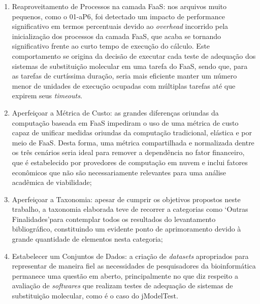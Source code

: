 \documentclass[english,brazilian]{UNISINOSmonografia} %
\begin{document}
\begin{enumerate}[label={\arabic*)}]
	\item Reaproveitamento de Processos na camada FaaS: nos arquivos muito pequenos, como o 01-aP6, foi detectado um impacto de performance significativo em termos percentuais devido ao \textit{overhead} incorrido pela inicialização dos processos da camada FaaS, que acaba se tornando significativo frente ao curto tempo de execução do cálculo.
	Este comportamento se origina da decisão de executar cada teste de adequação dos sistemas de substituição molecular em uma tarefa do FaaS, sendo que, para as tarefas de curtíssima duração, seria mais eficiente manter um número menor de unidades de execução ocupadas com múltiplas tarefas até que expirem seus \textit{timeouts}.
	
	\item Aperfeiçoar a Métrica de Custo: as grandes diferenças oriundas da computação baseada em FaaS impediram o uso de uma métrica de custo capaz de unificar medidas oriundas da computação tradicional, elástica e por meio de FaaS.
	Desta forma, uma métrica compartilhada e normalizada dentre os três cenários seria ideal para remover a dependência no fator financeiro, que é estabelecido por provedores de computação em nuvem e inclui fatores econômicos que não são necessariamente relevantes para uma análise acadêmica de viabilidade;
	
	\item Aperfeiçoar a Taxonomia: apesar de cumprir os objetivos propostos neste trabalho, a taxonomia elaborada teve de recorrer a categorias como \textquoteleft Outras Finalidades\textquoteright para contemplar todos os resultados do levantamento bibliográfico, constituindo um evidente ponto de aprimoramento devido à grande quantidade de elementos nesta categoria;
	
	\item Estabelecer um Conjuntos de Dados: a criação de \textit{datasets} apropriados para representar de maneira fiel as necessidades de pesquisadores da bioinformática permanece uma questão em aberto, principalmente no que diz respeito a avaliação de \textit{softwares} que realizam testes de adequação de sistemas de substituição molecular, como é o caso do jModelTest.

\end{enumerate}
 
%
\end{document}
